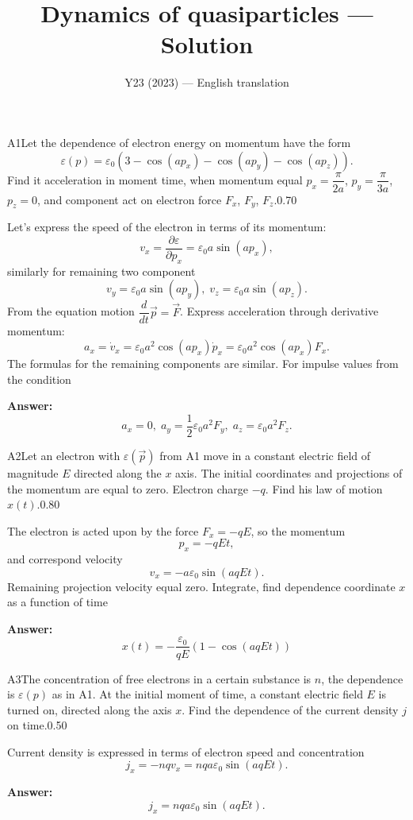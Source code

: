 \documentclass[11pt,a4paper]{article}
\title{\textbf{Dynamics of quasiparticles --- Solution}}
\author{\normalsize Y23 (2023) — English translation}
\date{}
\begin{document}
\maketitle\vspace{-0.5em}
\begin{solcard}{A1}{Let the dependence of electron energy on momentum have the form $$\varepsilon(p) = \varepsilon_0 (3 - \cos(ap_x) - \cos( ap_y) - \cos (ap_z)).$$ Find it acceleration in moment time, when momentum equal $p_x = \dfrac{\pi}{2 a}$, $p_y = \dfrac{\pi}{3 a}$, $p_z = 0$, and component act on electron force $F_x$, $F_y$, $F_z$.}{0.70}

Let's express the speed of the electron in terms of its momentum: $$ v_x = \frac{\partial \varepsilon}{\partial p_x} = \varepsilon_0 a \sin (a p_x), $$similarly for remaining two component $$ v_y = \varepsilon_0 a \sin(a p_y), \; v_z = \varepsilon_0 a \sin(a p_z). $$From the equation motion $\dfrac{d}{dt}\vec{p} = \vec{F}$. Express acceleration through derivative momentum: $$ a_x  = \dot{v}_x = \varepsilon_0 a^2 \cos (a p _x) \dot{p}_x = \varepsilon_0 a^2 \cos(a p_x) F_x. $$The formulas for the remaining components are similar.  For impulse values from the condition

\par\smallskip\noindent\textbf{Answer:} $$ a_x = 0, \; a_y = \frac{1}{2} \varepsilon_0 a^2 F_y, \; a_z = \varepsilon_0 a^2 F_z. $$
\end{solcard}

\begin{solcard}{A2}{Let an electron with $\varepsilon(\vec{p})$ from A1 move in a constant electric field of magnitude $E$ directed along the $x$ axis.  The initial coordinates and projections of the momentum are equal to zero. Electron charge $-q$. Find his law of motion $x(t)$.}{0.80}

The electron is acted upon by the force $F_x = - q E$, so the momentum $$ p_x = - q E t, $$and correspond velocity $$ v_x = -a \varepsilon_0 \sin(aqE t). $$Remaining projection velocity equal zero. Integrate, find dependence coordinate $x$ as a function of time

\par\smallskip\noindent\textbf{Answer:} $$ x(t) = -\frac{\varepsilon_0}{q E}(1 - \cos(a q Et )) $$
\end{solcard}

\begin{solcard}{A3}{The concentration of free electrons in a certain substance is $n$, the dependence is $\varepsilon(p)$ as in A1. At the initial moment of time, a constant electric field $E$ is turned on, directed along the axis $x$. Find the dependence of the current density $j$ on time.}{0.50}

Current density is expressed in terms of electron speed and concentration $$ j_x = - n q v_x = n q a \varepsilon_0 \sin (a q E t). $$

\par\smallskip\noindent\textbf{Answer:} $$ j_x = n q a \varepsilon_0 \sin (a q E t). $$
\end{solcard}
\end{document}
